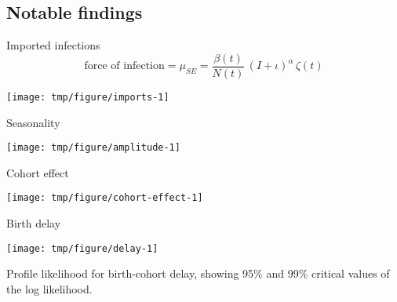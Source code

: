 \subsection{Notable findings}

\begin{frame}[fragile]{Imported infections}
  $$\text{force of infection} = \mu_{SE}=\frac{\beta(t)}{N(t)}\,(I+\iota)^{\alpha}\,\zeta(t)$$
\begin{knitrout}\small
{}\color{fgcolor}

{\centering \texttt{[image: tmp/figure/imports-1]} 

}


\end{knitrout}
\end{frame}

\begin{frame}[fragile]{Seasonality}
\begin{knitrout}\small
{}\color{fgcolor}

{\centering \texttt{[image: tmp/figure/amplitude-1]} 

}


\end{knitrout}
\end{frame}

\begin{frame}[fragile]{Cohort effect}
\begin{knitrout}\small
{}\color{fgcolor}

{\centering \texttt{[image: tmp/figure/cohort-effect-1]} 

}


\end{knitrout}
\end{frame}

\begin{frame}[fragile]{Birth delay}
\begin{knitrout}\small
{}\color{fgcolor}

{\centering \texttt{[image: tmp/figure/delay-1]} 

}


\end{knitrout}

  Profile likelihood for birth-cohort delay, showing 95\% and 99\% critical values of the log likelihood.
\end{frame}


